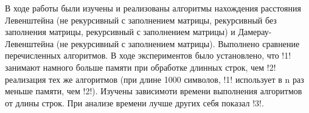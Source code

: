 \Conclusion
    В ходе работы были изучены и реализованы алгоритмы нахождения
    расстояния Левенштейна (не рекурсивный с заполнением матрицы,
    рекурсивный без заполнения матрицы, рекурсивный с заполнением матрицы)
    и Дамерау-Левенштейна (не рекурсивный с заполнением матрицы). 
    Выполнено сравнение перечисленных алгоритмов. В ходе экспериментов
    было установлено, что !1! занимают намного больше памяти при 
    обработке длинных строк, чем !2! реализация тех же алгоритмов
    (при длине 1000 символов, !1! использует в n раз меньше памяти,
    чем !2!). Изучены зависимоти времени выполнения алгоритмов от длины
    строк. При анализе времени лучше других себя показал !3!.  
